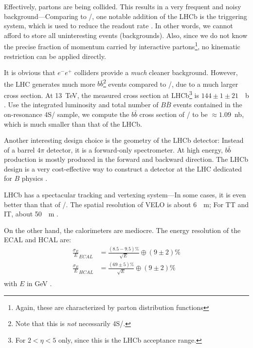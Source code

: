 Effectively, partons are being collided.
This results in a very frequent and noisy background---Comparing to \BaBar/, one
notable addition of the LHCb is the triggering system, which is used to reduce
the readout rate \cite{LHCb:2008}.
In other words, we cannot afford to store all uninteresting events
(backgrounds).
Also, since we do not know the precise fraction of momentum carried by
interactive partons\footnote{
Again, these are characterized by parton distribution functions}, no kinematic
restriction can be applied directly.

It is obvious that $e^- e^+$ colliders provide a \emph{much} cleaner background.
However, the LHC generates much more $b\bar{b}$\footnote{
    Note that this is \emph{not} necessarily \Y4S/.
} events compared to \BaBar/, due to a much larger cross section.
At \SI{13}{TeV}, the measured cross section at LHCb\footnote{
    For $2 < \eta < 5$ only, since this is the LHCb acceptance range.
} is $144 \pm 1 \pm 21$~\si{\mu b} \cite{Aaij:2016avz}.
Use the integrated luminosity and total number of $B\overline{B}$ events
contained in the on-resonance \Y4S/ sample, we compute the $b\bar{b}$ cross
section of \BaBar/ to be $\approx 1.09$~\si{nb}, which is much smaller than that
of the LHCb.

Another interesting design choice is the geometry of the LHCb detector:
Instead of a barrel $4\pi$ detector, it is a forward-only spectrometer.
At high energy, $b\bar{b}$ production is mostly produced
in the forward and backward direction.
The LHCb design is a very cost-effective way to construct a detector at the LHC
dedicated for $B$ physics \cite{LHCb:2008}.

LHCb has a spectacular tracking and vertexing system---In some cases, it is even
better than that of \BaBar/.
The spatial resolution of VELO is about \SI{6}{\mu m};
For TT and IT, about \SI{50}{\mu m} \cite{LHCb:2008}.

On the other hand, the calorimeters are mediocre.
The energy resolution of the ECAL and HCAL are:
\begin{align*}
    \frac{\sigma_E}{E}_{ECAL} &= \frac{(8.5-9.5)\%}{\sqrt{E}}
        \oplus (9 \pm 2)\% \\
    \frac{\sigma_E}{E}_{HCAL} &= \frac{(69 \pm 5)\%}{\sqrt{E}}
        \oplus (9 \pm 2)\% \\
\end{align*}
with $E$ in \si{GeV} \cite{Guz:2017}.

